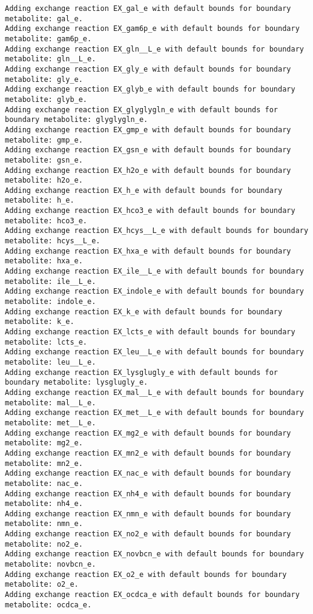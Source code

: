 \documentclass[
  letterpaper,
  DIV=11,
  numbers=noendperiod]{scrartcl}
\begin{document}
\begin{verbatim}
Adding exchange reaction EX_gal_e with default bounds for boundary metabolite: gal_e.
Adding exchange reaction EX_gam6p_e with default bounds for boundary metabolite: gam6p_e.
Adding exchange reaction EX_gln__L_e with default bounds for boundary metabolite: gln__L_e.
Adding exchange reaction EX_gly_e with default bounds for boundary metabolite: gly_e.
Adding exchange reaction EX_glyb_e with default bounds for boundary metabolite: glyb_e.
Adding exchange reaction EX_glyglygln_e with default bounds for boundary metabolite: glyglygln_e.
Adding exchange reaction EX_gmp_e with default bounds for boundary metabolite: gmp_e.
Adding exchange reaction EX_gsn_e with default bounds for boundary metabolite: gsn_e.
Adding exchange reaction EX_h2o_e with default bounds for boundary metabolite: h2o_e.
Adding exchange reaction EX_h_e with default bounds for boundary metabolite: h_e.
Adding exchange reaction EX_hco3_e with default bounds for boundary metabolite: hco3_e.
Adding exchange reaction EX_hcys__L_e with default bounds for boundary metabolite: hcys__L_e.
Adding exchange reaction EX_hxa_e with default bounds for boundary metabolite: hxa_e.
Adding exchange reaction EX_ile__L_e with default bounds for boundary metabolite: ile__L_e.
Adding exchange reaction EX_indole_e with default bounds for boundary metabolite: indole_e.
Adding exchange reaction EX_k_e with default bounds for boundary metabolite: k_e.
Adding exchange reaction EX_lcts_e with default bounds for boundary metabolite: lcts_e.
Adding exchange reaction EX_leu__L_e with default bounds for boundary metabolite: leu__L_e.
Adding exchange reaction EX_lysglugly_e with default bounds for boundary metabolite: lysglugly_e.
Adding exchange reaction EX_mal__L_e with default bounds for boundary metabolite: mal__L_e.
Adding exchange reaction EX_met__L_e with default bounds for boundary metabolite: met__L_e.
Adding exchange reaction EX_mg2_e with default bounds for boundary metabolite: mg2_e.
Adding exchange reaction EX_mn2_e with default bounds for boundary metabolite: mn2_e.
Adding exchange reaction EX_nac_e with default bounds for boundary metabolite: nac_e.
Adding exchange reaction EX_nh4_e with default bounds for boundary metabolite: nh4_e.
Adding exchange reaction EX_nmn_e with default bounds for boundary metabolite: nmn_e.
Adding exchange reaction EX_no2_e with default bounds for boundary metabolite: no2_e.
Adding exchange reaction EX_novbcn_e with default bounds for boundary metabolite: novbcn_e.
Adding exchange reaction EX_o2_e with default bounds for boundary metabolite: o2_e.
Adding exchange reaction EX_ocdca_e with default bounds for boundary metabolite: ocdca_e.

\end{verbatim}
\end{document}
